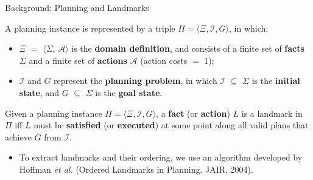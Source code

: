 \documentclass{beamer}
\begin{document}
    \begin{frame}{Background: Planning and Landmarks}
		\begin{definition} 
			A planning instance is represented by a triple $\Pi = \langle \Xi, \mathcal{I}, G\rangle$, in which:
			\begin{itemize}
				\item $\Xi$ $=$ $\langle$$\Sigma$, $\mathcal{A}$$\rangle$ is the \textbf{domain definition}, and consists of a finite set of \textbf{facts} $\Sigma$ and a finite set of \textbf{actions} $\mathcal{A}$ (action costs $=$ 1);
				\item $\mathcal{I}$ and $G$ represent the \textbf{planning problem}, in which $\mathcal{I}$ $\subseteq$ $\Sigma$ is the \textbf{initial state}, and $G$ $\subseteq$ $\Sigma$ is the \textbf{goal state}.
			\end{itemize}
		\end{definition}
		\begin{definition}
			Given a planning instance $\Pi = \langle \Xi, \mathcal{I}, G\rangle$, a \textbf{fact} (or \textbf{action}) $L$ is a landmark in $\Pi$ iff $L$ 	must be \textbf{satisfied} (or \textbf{executed}) at some point along all valid plans that achieve $G$ from $\mathcal{I}$.
		\end{definition}
		\begin{itemize}
			\item To extract landmarks and their ordering, we use an algorithm developed by Hoffman \emph{et al.} {\footnotesize (Ordered Landmarks in Planning. JAIR, 2004)}.
		\end{itemize}
    \end{frame}	
\fi

\end{document}
